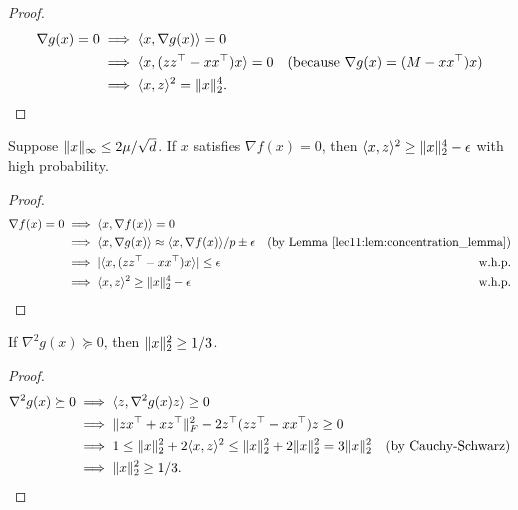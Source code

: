 \begin{proof}
\begin{align}
    \nabla g(x) = 0 &\implies \langle x, \nabla g(x) \rangle = 0 \\
   & \implies \langle x, (zz^\top-xx^\top)x \rangle = 0 & ({\textup{because}~} \nabla g(x) = (M - xx^\top)x) \\
   & \implies \langle x,z \rangle^2 = \|x\|_2^4.
\end{align}
\end{proof}

\begin{lemma}\label{lec11:lem:inner-f}
Suppose $\|x\|_\infty \leq 2\mu / \sqrt{d}$. If $x$ satisfies $\nabla f(x) = 0$, then $\langle x,z \rangle^2 \geq \|x\|_2^4 - \epsilon$ with high probability.
\label{inner_prod_norm_f}
\end{lemma}

\begin{proof}
\begin{align}
    \nabla f(x) = 0 &\implies \langle x, \nabla f(x) \rangle = 0 \\
    & \implies \langle x, \nabla g(x) \rangle \approx \langle x, \nabla f(x) \rangle/p \pm \epsilon & \text{(by Lemma \ref{lec11:lem:concentration_lemma})} \\
   & \implies |\langle x, (zz^\top-xx^\top)x \rangle| \leq \epsilon & \text{w.h.p.} \\
   & \implies \langle x,z \rangle^2 \geq \|x\|_2^4 - \epsilon & \text{w.h.p.}
\end{align}
\end{proof}

\begin{lemma}\label{lec11:lem:bound-g}
    If $\nabla^2 g(x) \succeq 0$, then $\|x\|_2^2 \geq 1/3$.
\end{lemma}

\begin{proof}
\begin{align}
    \nabla^2 g(x) \succeq 0
    &\implies \langle z, \nabla^2 g(x)z\rangle \geq 0 \\
    &\implies \|zx^\top + xz^\top\|_F^2 - 2z^\top(zz^\top-xx^\top)z \geq 0 \\
    &\implies 1 \leq \|x\|_2^2 + 2\langle x,z \rangle^2 \leq \|x\|_2^2 + 2\|x\|_2^2 = 3\|x\|_2^2 &\text{(by Cauchy-Schwarz)} \\
    &\implies \|x\|_2^2 \geq 1/3.
\end{align}
\end{proof}

